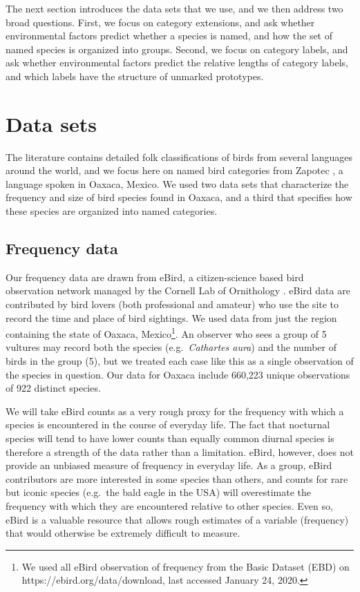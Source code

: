 \documentclass[10pt,letterpaper]{article}
\begin{document}
The next section introduces the data sets that we use, and we then address two broad questions. First, we focus on category extensions, and ask whether environmental factors predict whether a species is named, and how the set of named species is organized into groups. Second, we focus on category labels, and ask whether environmental factors predict the relative lengths of category labels, and which labels have the structure of unmarked prototypes. 


\section{Data sets}

The literature contains detailed folk classifications of birds from several languages around the world, and we focus here on named bird categories from Zapotec \cite{hunn2008zapotec}, a language spoken in Oaxaca, Mexico.  We used two data sets that characterize the frequency and size of bird species found in Oaxaca, and a third that specifies how these species are organized into named categories.

\subsection{Frequency data}

Our frequency data are drawn from eBird, a citizen-science based bird observation network managed by the Cornell Lab of Ornithology \cite{sullivan2009ebird}.  eBird data are contributed by bird lovers (both professional and amateur) who use the site to record the time and place of bird sightings.  We used data from just the region containing the state of Oaxaca, Mexico\footnote{We used all eBird observation of frequency from the Basic Dataset (EBD) on https://ebird.org/data/download, last accessed January 24, 2020.}. An observer who sees a group of 5 vultures may record both the species (e.g.\ \emph{Cathartes aura}) and the number of birds in the group (5), but we treated each case like this as a single observation of the species in question. Our data for Oaxaca include 660,223 unique observations of 922 distinct species. 

We will take eBird counts as a very rough proxy for the frequency with which a species is encountered in the course of everyday life. The fact that nocturnal species will tend to have lower counts than equally common diurnal species is therefore a strength of the data rather than a limitation. eBird, however,  does not provide an unbiased measure of frequency in everyday life. As a group, eBird contributors are more interested in some species than others, and counts for rare but iconic species (e.g.\ the bald eagle in the USA) will overestimate the frequency with which they are encountered relative to other species. Even so, eBird is a valuable resource that allows rough estimates of a variable (frequency) that would otherwise be extremely difficult to measure.  
\end{document}
